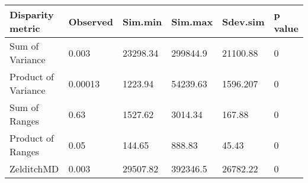 
\begin{tabular}[t]{l l l l l l }		%
\hline
\textbf{Disparity metric} & \textbf{Observed} & \textbf{Sim.min} & \textbf{Sim.max} & \textbf{Sdev.sim} & \textbf{p value} \\
\hline
Sum of Variance & 0.003 &	23298.34 &	299844.9 &	21100.88 &	0\\
Product of Variance	& 0.00013 &	1223.94 & 54239.63 &	1596.207 &	0\\
Sum of Ranges &	0.63 &	1527.62 &	3014.34 &	167.88 &	0 \\
Product of Ranges & 0.05 &	144.65 & 888.83 &	45.43 &	0\\
ZelditchMD & 0.003 & 29507.82 &	392346.5 &	26782.22 &	0
\\

\hline
\end{tabular}